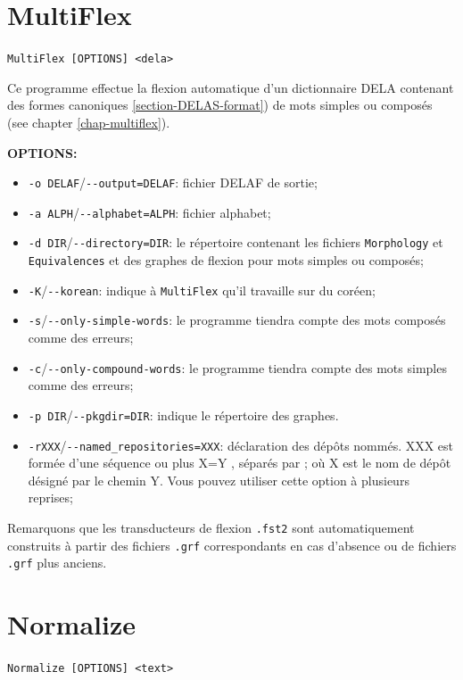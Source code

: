 \section{MultiFlex}
\verb+MultiFlex [OPTIONS] <dela>+

\bigskip
\noindent {}Ce programme effectue
la flexion automatique d'un dictionnaire DELA contenant des formes canoniques 
\ref{section-DELAS-format}) de mots simples ou composés (see chapter \ref{chap-multiflex}).

\bigskip
\noindent \textbf{OPTIONS:}
\begin{itemize}
\item \verb+-o DELAF+/\verb+--output=DELAF+: fichier DELAF de sortie;
  \item \verb+-a ALPH+/\verb+--alphabet=ALPH+: fichier alphabet;
  \item \verb+-d DIR+/\verb+--directory=DIR+: le répertoire contenant les fichiers 
  	  \verb+Morphology+ et \verb+Equivalences+ et des graphes de flexion pour mots
  	  simples ou composés;
  \item \verb+-K+/\verb+--korean+: indique à \verb+MultiFlex+ qu'il travaille sur du coréen;
  \item \verb+-s+/\verb+--only-simple-words+: le programme tiendra compte des mots composés comme
  	  des erreurs;
  \item \verb+-c+/\verb+--only-compound-words+: le programme tiendra compte des mots simples comme
  	  des erreurs;
  \item \verb+-p DIR+/\verb+--pkgdir=DIR+: indique le répertoire des graphes.
  \item \verb+-rXXX+/\verb+--named_repositories=XXX+: déclaration des dépôts nommés. XXX est formée
  	  d'une séquence ou plus X=Y , séparés par ; où X est le nom de dépôt désigné par le chemin
  	  Y. Vous pouvez utiliser cette option à plusieurs reprises;
  
\end{itemize}

\bigskip
\noindent Remarquons que les transducteurs de flexion \verb+.fst2+ sont automatiquement construits à
partir des fichiers \verb+.grf+ correspondants en cas d'absence ou de fichiers \verb+.grf+ plus
anciens.







\section{Normalize}
\verb+Normalize [OPTIONS] <text>+

